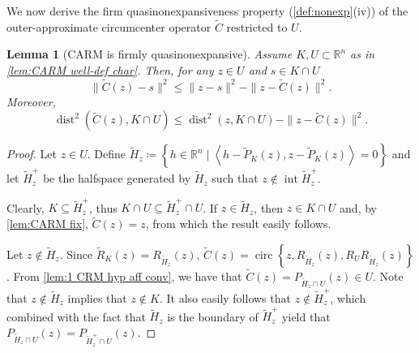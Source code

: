 \documentclass[smallextended,numbook,nospthms]{svjour3}
\theoremstyle{plain}
\newtheorem{lemma}[theorem]{Lemma}
\theoremstyle{definition}
\def\RR{\mathds R}
\DeclareMathOperator{\dist}{dist}
\DeclareMathOperator{\inte}{int}
\newcommand{\scal}[2]{\left\langle{#1},{#2}  \right\rangle}
\DeclareMathOperator{\circum}{circ}
\begin{document}
We now derive the firm quasinonexpansiveness property (\cref{def:nonexp}(iv)) of the outer-approximate circumcenter operator $\tilde{C}$ restricted to $U$.
\begin{lemma}[CARM is firmly quasinonexpansive] \label{lem:CARM quasinonexp}
	Assume $K, U \subset \RR^{n}$ as in  \cref{lem:CARM well-def char}. Then, for any $z \in U$ and $s \in K \cap U$
	\begin{equation}\label{eq: CARM fqne}
		\|\tilde{C}(z)-s\|^{2} \leq \|z-s\|^{2}-\|z-\tilde{C}(z)\|^{2}.
		\end{equation}
	Moreover,
	\begin{equation}
		\dist^{2}(\tilde{C}(z), K \cap U) \leq \dist^{2}(z, K \cap U)-\|z-\tilde{C}(z)\|^{2}.
	\end{equation}
\end{lemma}
	\begin{proof}
	
	
	Let $z \in U$. Define $\tilde{H}_{z} \coloneqq \left\{h \in \RR^{n} \mid \scal{h-\tilde{P}_{K}(z)}{z-\tilde{P}_{K}(z)}=0\right\}$ %
	and let $\tilde{H}_{z}^{+}$ be the halfspace generated by $\tilde{H}_{z}$ such that $z \notin \inte\tilde{H}^{+}_{z}$.
	
	Clearly, $K \subseteq \tilde{H}_{z}^{+}$, thus $K \cap U \subseteq \tilde{H}_{z}^{+} \cap U$. If $z \in \tilde{H}_{z}$, then $z \in K \cap U$ and, by  \cref{lem:CARM fix}, $\tilde{C}(z)=z$, from which the result easily follows.
	
	Let $z \notin \tilde{H}_{z}$. Since $\tilde{R}_{K}(z)=R_{\tilde{H}_{z}}(z)$,  $\tilde{C}(z)=\circum\left\{z, R_{\tilde{H}_{z}}(z), R_{U}R_{\tilde{H}_{z}}(z)\right\}$. From  \cref{lem:1 CRM hyp aff conv}, we have that $\tilde{C}(z)=P_{\tilde{H}_{z}\cap U}(z) \in U$. Note that $z \not\in \tilde{H}_{z}$ implies that $z \not\in K$. It also easily follows that $z \notin \tilde{H}_{z}^{+}$, which combined with the fact that $\tilde{H}_{z}$ is the boundary of $\tilde{H}_{z}^{+}$ yield that $P_{\tilde{H}_{z} \cap U}(z)=P_{\tilde{H}_{z}^{+} \cap U}(z)$.
	

\end{proof}
\end{document}
